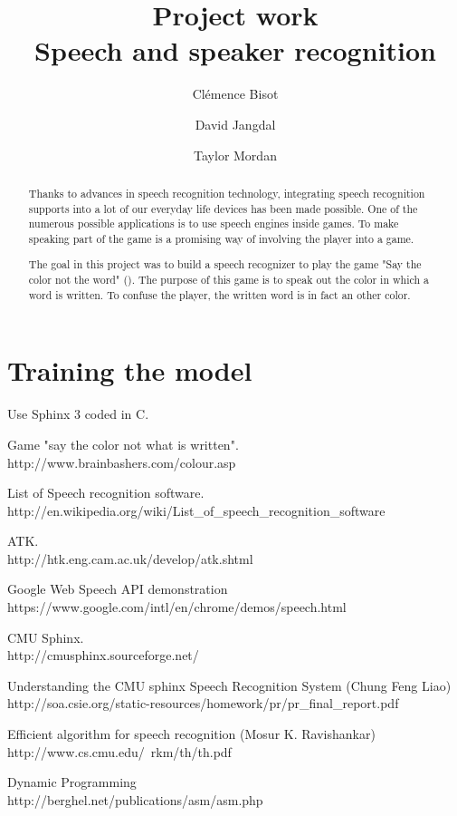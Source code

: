 \documentclass{report}
\begin{document}
\title{Project work \\ Speech and speaker recognition}
\author{Cl\'{e}mence Bisot \and David Jangdal \and Taylor Mordan}
\maketitle

\begin{abstract}
Thanks to advances in speech recognition technology, integrating speech recognition supports into a lot of our everyday life devices has been made possible. One of the numerous possible applications is to use speech engines inside games. To make speaking part of the game is a promising way of involving the player into a game. 

The goal in this project was to build a speech recognizer to play the game "Say the color not the word" (\cite{game_site}). The purpose of this game is to speak out the color in which a word is written. To confuse the player, the written word is in fact an other color. 


\end{abstract}





\section*{Training the model}
Use Sphinx 3 coded in C. 

\begin{thebibliography}{40}
 Game "say the color not what is written". \\ http://www.brainbashers.com/colour.asp

 List of Speech recognition software. \\ http://en.wikipedia.org/wiki/List\_of\_speech\_recognition\_software

 ATK. \\ http://htk.eng.cam.ac.uk/develop/atk.shtml

 Google Web Speech API demonstration \\ https://www.google.com/intl/en/chrome/demos/speech.html

 CMU Sphinx. \\ http://cmusphinx.sourceforge.net/

 Understanding the CMU sphinx Speech Recognition System (Chung Feng Liao) \\ http://soa.csie.org/static-resources/homework/pr/pr\_final\_report.pdf

 Efficient algorithm for speech recognition (Mosur K. Ravishankar) \\ http://www.cs.cmu.edu/~rkm/th/th.pdf

 Dynamic Programming \\ http://berghel.net/publications/asm/asm.php

\end{thebibliography}
\end{document}
